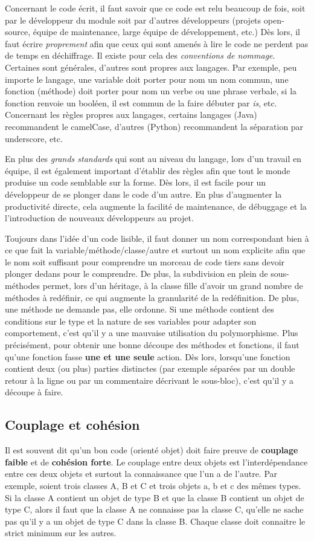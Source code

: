 \documentclass{article}
\begin{document}
		Concernant le code écrit, il faut savoir que ce code est relu beaucoup de fois, soit par le développeur du module soit par d'autres développeurs (projets open-source, équipe de maintenance,
		large équipe de développement, etc.) Dès lors, il faut écrire \textit{proprement} afin que ceux qui sont amenés à lire le code ne perdent pas de temps en déchiffrage. Il existe pour cela
		des \textit{conventions de nommage}. Certaines sont générales, d'autres sont propres aux langages. Par exemple, peu importe le langage, une variable doit porter pour nom un nom commun, une
		fonction (méthode) doit porter pour nom un verbe ou une phrase verbale, si la fonction renvoie un booléen, il est commun de la faire débuter par \textit{is}, etc. Concernant les règles
		propres aux langages, certains langages (Java) recommandent le camelCase, d'autres (Python) recommandent la séparation par underscore, etc.

		En plus des \textit{grands standards} qui sont au niveau du langage, lors d'un travail en équipe, il est également important d'établir des règles afin que tout le monde produise
		un code semblable sur la forme. Dès lors, il est facile pour un développeur de se plonger dans le code d'un autre. En plus d'augmenter la productivité directe, cela augmente la facilité
		de maintenance, de débuggage et la l'introduction de nouveaux développeurs au projet.

		Toujours dans l'idée d'un code lisible, il faut donner un nom correspondant bien à ce que fait la variable/méthode/classe/autre et surtout un nom explicite afin que le nom soit
		suffisant pour comprendre un morceau de code tiers sans devoir plonger dedans pour le comprendre. De plus, la subdivision en plein de sous-méthodes permet, lors d'un héritage, à la classe
		fille d'avoir un grand nombre de méthodes à redéfinir, ce qui augmente la granularité de la redéfinition. De plus, une méthode ne demande pas, elle ordonne. Si une méthode contient des
		conditions sur le type et la nature de ses variables pour adapter son comportement, c'est qu'il y a une mauvaise utilisation du polymorphisme. Plus précisément, pour obtenir une
		bonne découpe des méthodes et fonctions, il faut qu'une fonction fasse \textbf{une et une seule} action. Dès lors, lorsqu'une fonction contient deux (ou plus) parties distinctes (par
		exemple séparées par un double retour à la ligne ou par un commentaire décrivant le sous-bloc), c'est qu'il y a découpe à faire.

	\subsection{Couplage et cohésion}
		Il est souvent dit qu'un bon code (orienté objet) doit faire preuve de \textbf{couplage faible} et de \textbf{cohésion forte}. Le couplage entre deux objets est l'interdépendance entre ces
		deux objets et surtout la connaissance que l'un a de l'autre. Par exemple, soient trois classes A, B et C et trois objets a, b et c des mêmes types. Si la classe A contient un objet de
		type B et que la classe B contient un objet de type C, alors il faut que la classe A ne connaisse pas la classe C, qu'elle ne sache pas qu'il y a un objet de type C dans la classe B.
		Chaque classe doit connaitre le strict minimum sur les autres.
\end{document}
